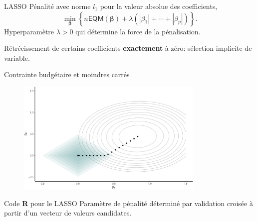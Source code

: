 \documentclass[
  ignorenonframetext,
]{beamer}
\newenvironment{Shaded}{\begin{snugshade}}{\end{snugshade}}
\newcommand{\AttributeTok}[1]{\textcolor[rgb]{0.40,0.45,0.13}{#1}}
\newcommand{\DecValTok}[1]{\textcolor[rgb]{0.68,0.00,0.00}{#1}}
\newcommand{\FloatTok}[1]{\textcolor[rgb]{0.68,0.00,0.00}{#1}}
\newcommand{\FunctionTok}[1]{\textcolor[rgb]{0.28,0.35,0.67}{#1}}
\newcommand{\NormalTok}[1]{\textcolor[rgb]{0.00,0.23,0.31}{#1}}
\newcommand{\OtherTok}[1]{\textcolor[rgb]{0.00,0.23,0.31}{#1}}
\newcommand{\SpecialCharTok}[1]{\textcolor[rgb]{0.37,0.37,0.37}{#1}}
\begin{document}
\begin{frame}{LASSO}
\protect\hypertarget{lasso}{}
Pénalité avec norme \(l_1\) pour la valeur absolue des coefficients,
\[ \min_{\boldsymbol{\beta}} \left\{ n\mathsf{EQM}(\boldsymbol{\beta}) + \lambda(|\beta_1| + \cdots + |\beta_p|)\right\}.\]
Hyperparamètre \(\lambda>0\) qui détermine la force de la pénalisation.

Rétrécissement de certains coefficients \textbf{exactement} à zéro:
sélection implicite de variable.
\end{frame}

\begin{frame}{Contrainte budgétaire et moindres carrés}
\protect\hypertarget{contrainte-budguxe9taire-et-moindres-carruxe9s}{}
\begin{figure}

{\centering \includegraphics[width=0.8\textwidth,height=\textheight]{figures/fig-lassopenalty.pdf}

}

\end{figure}
\end{frame}

\begin{frame}[fragile]{Code \textbf{R} pour le LASSO}
\protect\hypertarget{code-r-pour-le-lasso}{}
Paramètre de pénalité déterminé par validation croisée à partir d'un
vecteur de valeurs candidates.

\begin{Shaded}
\end{Shaded}
\end{frame}
\end{document}
